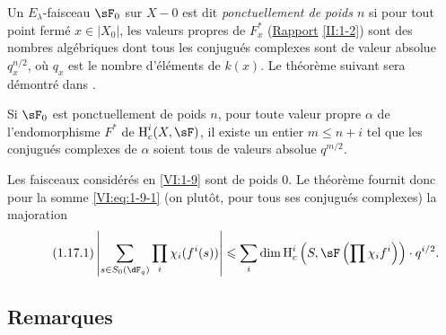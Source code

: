 Un $E_\lambda$-faisceau $\sF_0$ sur $X-0$ est dit \emph{ponctuellement de 
poids $n$} si pour tout point fermé $x\in |X_0|$, les valeurs propres de 
$F_x^\ast$ (\hyperref[II]{Rapport} \ref{II:1-2}) sont des nombres algébriques 
dont tous les conjugués complexes sont de valeur absolue 
$q_x^{n/2}$, où $q_x$ est le nombre d'éléments de $k(x)$. Le théorème 
suivant sera démontré dans \cite{de80}. 





\begin{theorem_}\label{VI:1-17}
Si $\sF_0$ est ponctuellement de poids $n$, pour toute valeur propre $\alpha$ 
de l'endomorphisme $F^\ast$ de $\h_c^i(X,\sF)$, il existe un entier 
$m\leqslant n+i$ tel que les conjugués complexes de $\alpha$ soient tous de 
valeurs absolue $q^{m/2}$.
\end{theorem_}

Les faisceaux considérés en \ref{VI:1-9} sont de poids $0$. Le théorème 
fournit donc pour la somme \ref{VI:eq:1-9-1} (on plutôt, pour tous ses 
conjugués complexes) la majoration 
\begin{equation*}\tag{1.17.1}\label{VI:eq:1-17-1}
  \left|\sum_{s\in S_0(\dF_q)} \prod_i \chi_i(f^i(s)) \right| \leqslant \sum_i \dim \h_c^i\left(S,\sF\left(\prod \chi_i f^i\right)\right)\cdot q^{i/2} \text{.}
\end{equation*}





\subsection{Remarques}\label{VI:1-18}

